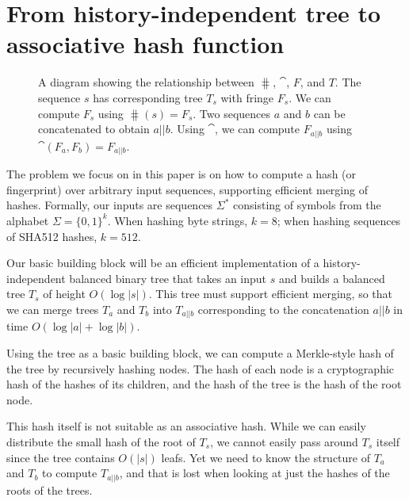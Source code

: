 \section{From history-independent tree to associative hash function}
\label{s:overview}

\begin{figure}[htb]
\begin{center}
\end{center}
\caption{A diagram showing the relationship between $\hash$, $\cat$, $F$, and $T$. The sequence $s$ has corresponding tree $T_s$ with fringe $F_s$. We can compute $F_s$ using $\hash(s) = F_s$. Two sequences $a$ and $b$ can be concatenated to obtain $a||b$. Using $\cat$, we can compute $F_{a||b}$ using $\cat(F_a, F_b) = F_{a||b}$.}
\label{fig:diagram}
\end{figure}

The problem we focus on in this paper is on how to compute a hash (or
fingerprint) over arbitrary input sequences, supporting efficient merging of
hashes. Formally, our inputs are sequences $\Sigma^*$ consisting of symbols
from the alphabet $\Sigma = \{0,1\}^k$. When hashing byte strings, $k=8$; when hashing sequences of SHA512 hashes, $k=512$.

Our basic building block will be an efficient implementation of a
history-independent balanced binary tree that takes an input $s$ and builds a
balanced tree $T_s$ of height $O(\log |s|)$. This tree must support efficient
merging, so that we can merge trees $T_a$ and $T_b$ into $T_{a||b}$
corresponding to the concatenation $a||b$ in time $O(\log |a| + \log |b|)$.

Using the tree as a basic building block, we can compute a Merkle-style hash of
the tree by recursively hashing nodes. The hash of each node is a cryptographic
hash of the hashes of its children, and the hash of the tree is the hash of the
root node.

This hash itself is not suitable as an associative hash. While we can easily
distribute the small hash of the root of $T_s$, we cannot easily pass around
$T_s$ itself since the tree contains $O(|s|)$ leafs.  Yet we need to know the
structure of $T_a$ and $T_b$ to compute $T_{a||b}$, and that is lost when
looking at just the hashes of the roots of the trees.

